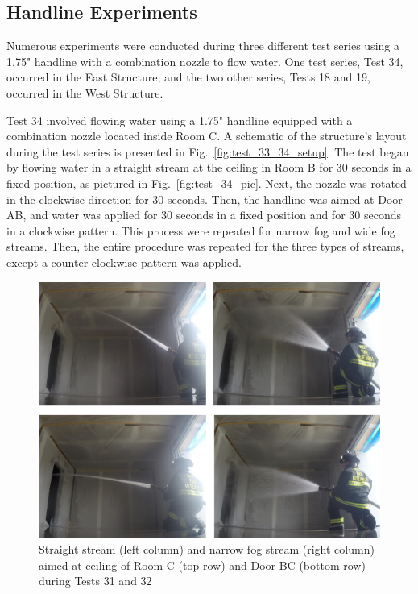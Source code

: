 \documentclass[12pt,oneside]{book}
\begin{document}
\clearpage

\subsection{Handline Experiments}
\label{subsec:handline_procedure}
Numerous experiments were conducted during three different test series using a 1.75" handline with a combination nozzle to flow water. One test series, Test 34, occurred in the East Structure, and the two other series, Tests 18 and 19, occurred in the West Structure. 

Test 34 involved flowing water using a 1.75" handline equipped with a combination nozzle located inside Room C. A schematic of the structure's layout during the test series is presented in Fig.~\ref{fig:test_33_34_setup}. The test began by flowing water in a straight stream at the ceiling in Room B for 30 seconds in a fixed position, as pictured in Fig.~\ref{fig:test_34_pic}. Next, the nozzle was rotated in the clockwise direction for 30 seconds. Then, the handline was aimed at Door AB, and water was applied for 30 seconds in a fixed position and for 30 seconds in a clockwise pattern. This process were repeated for narrow fog and wide fog streams. Then, the entire procedure was repeated for the three types of streams, except a counter-clockwise pattern was applied.

\begin{figure}[!ht]
\includegraphics[width=6in]{../Pictures/East_handline_C_BC.pdf}
\caption[Straight Stream and Narrow Fog Stream during Tests 31 and 32]{Straight stream (left column) and narrow fog stream (right column) aimed at ceiling of Room C (top row) and Door BC (bottom row) during Tests 31 and 32}
\label{fig:test_31_32_pic}
\end{figure}
\end{document}
